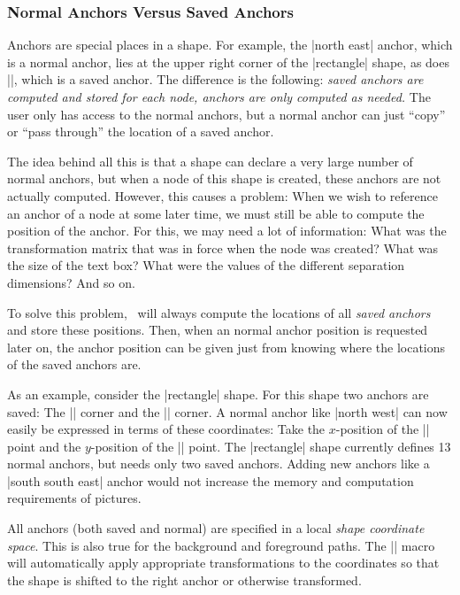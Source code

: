 \subsubsection{Normal Anchors Versus Saved Anchors}

Anchors  are special places in a shape. For example, the |north east| anchor,
which is a normal anchor, lies at the upper right corner of the |rectangle|
shape, as does |\northeast|, which is a saved anchor. The difference is the
following: \emph{saved anchors are computed and stored for each node, anchors
are only computed as needed.} The user only has access to the normal anchors,
but a normal anchor can just ``copy'' or ``pass through'' the location of a
saved anchor.

The idea behind all this is that a shape can declare a very large number of
normal anchors, but when a node of this shape is created, these anchors are not
actually computed. However, this causes a problem: When we wish to reference an
anchor of a node at some later time, we must still be able to compute the
position of the anchor. For this, we may need a lot of information: What was
the transformation matrix that was in force when the node was created? What was
the size of the text box? What were the values of the different separation
dimensions? And so on.

To solve this problem, \pgfname\ will always compute the locations of all
\emph{saved anchors} and store these positions. Then, when an normal anchor
position is requested later on, the anchor position can be given just from
knowing where the locations of the saved anchors are.

As an example, consider the |rectangle| shape. For this shape two anchors are
saved: The |\northeast| corner and the |\southwest| corner. A normal anchor
like |north west| can now easily be expressed in terms of these coordinates:
Take the $x$-position of the |\southwest| point  and the $y$-position of the
|\northeast| point. The |rectangle| shape currently defines 13 normal anchors,
but needs only two saved anchors. Adding new anchors like a  |south south east|
anchor would not increase the memory and computation requirements of pictures.

All anchors (both saved and normal) are specified in a local \emph{shape
coordinate space}. This is also true for the background and foreground paths.
The |\pgfnode| macro will automatically apply appropriate transformations to
the coordinates so that the shape is shifted to the right anchor or otherwise
transformed.


